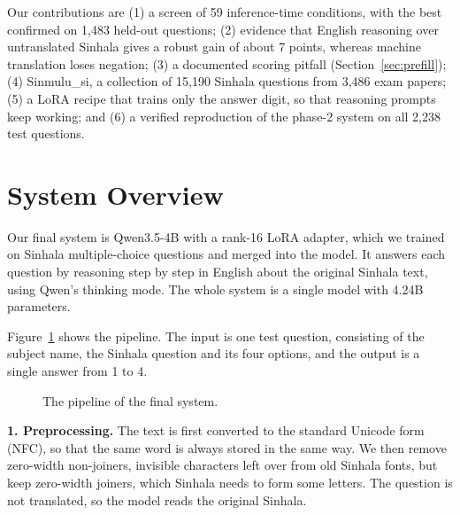 \documentclass[11pt]{article}
\newcommand{\para}[1]{\smallskip\noindent\textbf{#1}\enspace}
\newcommand{\sinmulu}{Sinmulu\_si}
\begin{document}
Our contributions are (1) a screen of 59 inference-time conditions, with the best confirmed on 1,483 held-out questions; (2) evidence that English reasoning over untranslated Sinhala gives a robust gain of about 7 points, whereas machine translation loses negation; (3) a documented scoring pitfall (Section~\ref{sec:prefill}); (4) \sinmulu{}, a collection of 15,190 Sinhala questions from 3,486 exam papers; (5) a LoRA recipe that trains only the answer digit, so that reasoning prompts keep working; and (6) a verified reproduction of the phase-2 system on all 2,238 test questions.

\section{System Overview}\label{sec:system}
Our final system is Qwen3.5-4B with a rank-16 LoRA adapter, which we trained on Sinhala multiple-choice questions and merged into the model. It answers each question by reasoning step by step in English about the original Sinhala text, using Qwen's thinking mode. The whole system is a single model with 4.24B parameters.

Figure~\ref{fig:pipeline} shows the pipeline. The input is one test question, consisting of the subject name, the Sinhala question and its four options, and the output is a single answer from 1 to 4.

\begin{figure}[t]
\centering
{}
\caption{The pipeline of the final system.}\label{fig:pipeline}
\end{figure}

\para{1. Preprocessing.} The text is first converted to the standard Unicode form (NFC), so that the same word is always stored in the same way. We then remove zero-width non-joiners, invisible characters left over from old Sinhala fonts, but keep zero-width joiners, which Sinhala needs to form some letters. The question is not translated, so the model reads the original Sinhala.
\end{document}
